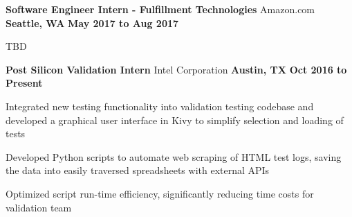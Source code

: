 \begin{cventries}
  \cventry
    {\normalsize \textbf{Software Engineer Intern - Fulfillment Technologies}}
    {\large Amazon.com}
    {\normalsize \textbf{Seattle, WA}}
    {\normalsize \textbf{May 2017 to Aug 2017}}
    {
      \begin{cvitems}
        \item {\normalsize TBD}
      \end{cvitems}
    }
  \cventry
    {\normalsize \textbf{Post Silicon Validation Intern}}
    {\large Intel Corporation}
    {\normalsize \textbf{Austin, TX}}
    {\normalsize \textbf{Oct 2016 to Present}}
    {
      \begin{cvitems}
        \item {\normalsize Integrated new testing functionality into validation testing codebase and developed a graphical user interface in Kivy to simplify selection and loading of tests}
        \item {\normalsize Developed Python scripts to automate web scraping of HTML test logs, saving the data into easily traversed spreadsheets with external APIs}
        \item {\normalsize Optimized script run-time efficiency, significantly reducing time costs for validation team}
      \end{cvitems}
    }
\end{cventries}
